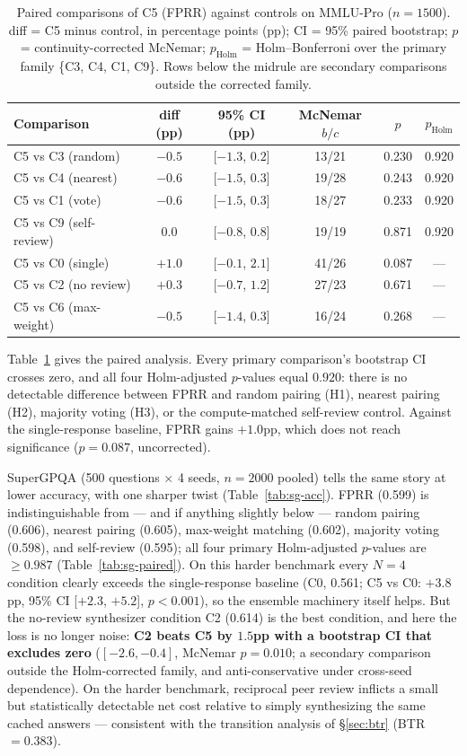 \documentclass[11pt]{article}
\begin{document}
\begin{table}[t]
\centering
\small
\caption{Paired comparisons of C5 (FPRR) against controls on MMLU-Pro ($n=1500$). diff = C5 minus control, in percentage points (pp); CI = 95\% paired bootstrap; $p$ = continuity-corrected McNemar; $p_{\mathrm{Holm}}$ = Holm--Bonferroni over the primary family \{C3, C4, C1, C9\}. Rows below the midrule are secondary comparisons outside the corrected family.}
\label{tab:mmlu-paired}
\begin{tabular}{lccccc}
\toprule
Comparison & diff (pp) & 95\% CI (pp) & McNemar $b/c$ & $p$ & $p_{\mathrm{Holm}}$ \\
\midrule
C5 vs C3 (random)      & $-0.5$ & [$-1.3$, $0.2$] & 13/21 & 0.230 & 0.920 \\
C5 vs C4 (nearest)     & $-0.6$ & [$-1.5$, $0.3$] & 19/28 & 0.243 & 0.920 \\
C5 vs C1 (vote)        & $-0.6$ & [$-1.5$, $0.3$] & 18/27 & 0.233 & 0.920 \\
C5 vs C9 (self-review) & $0.0$  & [$-0.8$, $0.8$] & 19/19 & 0.871 & 0.920 \\
\midrule
C5 vs C0 (single)      & $+1.0$ & [$-0.1$, $2.1$] & 41/26 & 0.087 & --- \\
C5 vs C2 (no review)   & $+0.3$ & [$-0.7$, $1.2$] & 27/23 & 0.671 & --- \\
C5 vs C6 (max-weight)  & $-0.5$ & [$-1.4$, $0.3$] & 16/24 & 0.268 & --- \\
\bottomrule
\end{tabular}
\end{table}

Table~\ref{tab:mmlu-paired} gives the paired analysis. Every primary comparison's bootstrap CI crosses zero, and all four Holm-adjusted $p$-values equal $0.920$: there is no detectable difference between FPRR and random pairing (H1), nearest pairing (H2), majority voting (H3), or the compute-matched self-review control. Against the single-response baseline, FPRR gains $+1.0$pp, which does not reach significance ($p=0.087$, uncorrected).

SuperGPQA (500 questions $\times$ 4 seeds, $n=2000$ pooled) tells the same story at lower accuracy, with one sharper twist (Table~\ref{tab:sg-acc}). FPRR (0.599) is indistinguishable from --- and if anything slightly below --- random pairing (0.606), nearest pairing (0.605), max-weight matching (0.602), majority voting (0.598), and self-review (0.595); all four primary Holm-adjusted $p$-values are $\ge 0.987$ (Table~\ref{tab:sg-paired}). On this harder benchmark every $N{=}4$ condition clearly exceeds the single-response baseline (C0, 0.561; C5 vs C0: $+3.8$pp, 95\% CI [$+2.3$, $+5.2$], $p<0.001$), so the ensemble machinery itself helps. But the no-review synthesizer condition C2 (0.614) is the best condition, and here the loss is no longer noise: \textbf{C2 beats C5 by $1.5$pp with a bootstrap CI that excludes zero} ($[-2.6, -0.4]$, McNemar $p=0.010$; a secondary comparison outside the Holm-corrected family, and anti-conservative under cross-seed dependence). On the harder benchmark, reciprocal peer review inflicts a small but statistically detectable net cost relative to simply synthesizing the same cached answers --- consistent with the transition analysis of \S\ref{sec:btr} (BTR $= 0.383$).
\end{document}
